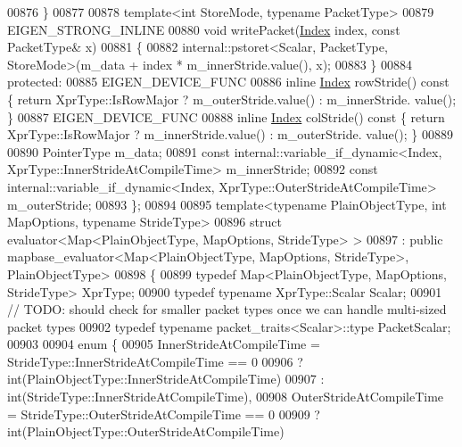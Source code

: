 \begin{DoxyCode}
00876   \}
00877 
00878   \textcolor{keyword}{template}<\textcolor{keywordtype}{int} StoreMode, \textcolor{keyword}{typename} PacketType>
00879   EIGEN\_STRONG\_INLINE
00880   \textcolor{keywordtype}{void} writePacket(\hyperlink{namespace_eigen_a62e77e0933482dafde8fe197d9a2cfde}{Index} index, \textcolor{keyword}{const} PacketType& x)
00881   \{
00882     internal::pstoret<Scalar, PacketType, StoreMode>(m\_data + index * m\_innerStride.value(), x);
00883   \}
00884 \textcolor{keyword}{protected}:
00885   EIGEN\_DEVICE\_FUNC
00886   \textcolor{keyword}{inline} \hyperlink{namespace_eigen_a62e77e0933482dafde8fe197d9a2cfde}{Index} rowStride()\textcolor{keyword}{ const }\{ \textcolor{keywordflow}{return} XprType::IsRowMajor ? m\_outerStride.value() : m\_innerStride.
      value(); \}
00887   EIGEN\_DEVICE\_FUNC
00888   \textcolor{keyword}{inline} \hyperlink{namespace_eigen_a62e77e0933482dafde8fe197d9a2cfde}{Index} colStride()\textcolor{keyword}{ const }\{ \textcolor{keywordflow}{return} XprType::IsRowMajor ? m\_innerStride.value() : m\_outerStride.
      value(); \}
00889 
00890   PointerType m\_data;
00891   \textcolor{keyword}{const} internal::variable\_if\_dynamic<Index, XprType::InnerStrideAtCompileTime> m\_innerStride;
00892   \textcolor{keyword}{const} internal::variable\_if\_dynamic<Index, XprType::OuterStrideAtCompileTime> m\_outerStride;
00893 \};
00894 
00895 \textcolor{keyword}{template}<\textcolor{keyword}{typename} PlainObjectType, \textcolor{keywordtype}{int} MapOptions, \textcolor{keyword}{typename} Str\textcolor{keywordtype}{id}eType> 
00896 \textcolor{keyword}{struct }evaluator<Map<PlainObjectType, MapOptions, StrideType> >
00897   : \textcolor{keyword}{public} mapbase\_evaluator<Map<PlainObjectType, MapOptions, StrideType>, PlainObjectType>
00898 \{
00899   \textcolor{keyword}{typedef} Map<PlainObjectType, MapOptions, StrideType> XprType;
00900   \textcolor{keyword}{typedef} \textcolor{keyword}{typename} XprType::Scalar Scalar;
00901   \textcolor{comment}{// TODO: should check for smaller packet types once we can handle multi-sized packet types}
00902   \textcolor{keyword}{typedef} \textcolor{keyword}{typename} packet\_traits<Scalar>::type PacketScalar;
00903   
00904   \textcolor{keyword}{enum} \{
00905     InnerStrideAtCompileTime = StrideType::InnerStrideAtCompileTime == 0
00906                              ? int(PlainObjectType::InnerStrideAtCompileTime)
00907                              : int(StrideType::InnerStrideAtCompileTime),
00908     OuterStrideAtCompileTime = StrideType::OuterStrideAtCompileTime == 0
00909                              ? int(PlainObjectType::OuterStrideAtCompileTime)

\end{DoxyCode}
